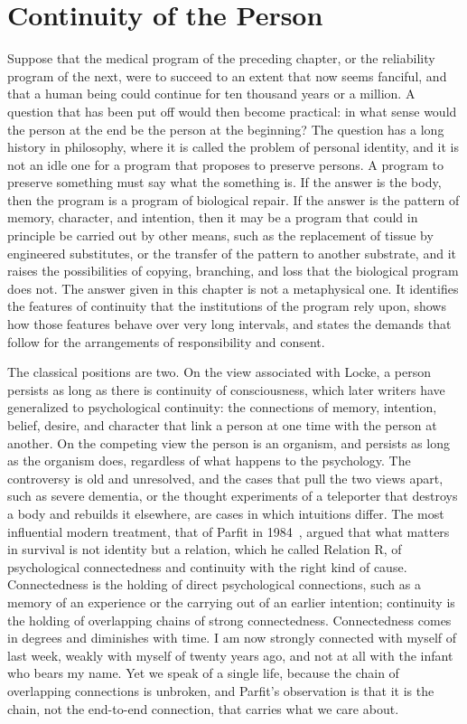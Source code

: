 \chapter{Continuity of the Person}
\label{ch:28}

Suppose that the medical program of the preceding chapter, or the reliability program of the next, were to succeed to an extent that now seems fanciful, and that a human being could continue for ten thousand years or a million. A question that has been put off would then become practical: in what sense would the person at the end be the person at the beginning? The question has a long history in philosophy, where it is called the problem of personal identity, and it is not an idle one for a program that proposes to preserve persons. A program to preserve something must say what the something is. If the answer is the body, then the program is a program of biological repair. If the answer is the pattern of memory, character, and intention, then it may be a program that could in principle be carried out by other means, such as the replacement of tissue by engineered substitutes, or the transfer of the pattern to another substrate, and it raises the possibilities of copying, branching, and loss that the biological program does not. The answer given in this chapter is not a metaphysical one. It identifies the features of continuity that the institutions of the program rely upon, shows how those features behave over very long intervals, and states the demands that follow for the arrangements of responsibility and consent.

The classical positions are two. On the view associated with Locke, a person persists as long as there is continuity of consciousness, which later writers have generalized to psychological continuity: the connections of memory, intention, belief, desire, and character that link a person at one time with the person at another. On the competing view the person is an organism, and persists as long as the organism does, regardless of what happens to the psychology. The controversy is old and unresolved, and the cases that pull the two views apart, such as severe dementia, or the thought experiments of a teleporter that destroys a body and rebuilds it elsewhere, are cases in which intuitions differ. The most influential modern treatment, that of Parfit in 1984~\cite{parfit1984}, argued that what matters in survival is not identity but a relation, which he called Relation R, of psychological connectedness and continuity with the right kind of cause. Connectedness is the holding of direct psychological connections, such as a memory of an experience or the carrying out of an earlier intention; continuity is the holding of overlapping chains of strong connectedness. Connectedness comes in degrees and diminishes with time. I am now strongly connected with myself of last week, weakly with myself of twenty years ago, and not at all with the infant who bears my name. Yet we speak of a single life, because the chain of overlapping connections is unbroken, and Parfit's observation is that it is the chain, not the end-to-end connection, that carries what we care about.


